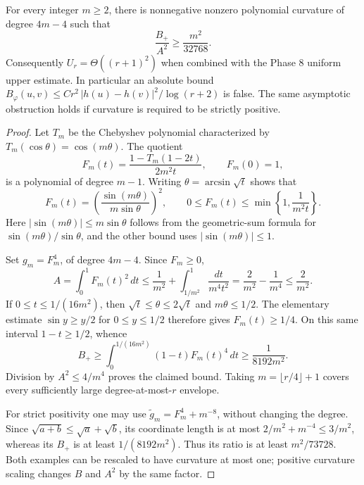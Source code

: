 \begin{proposition}
For every integer $m\geq2$, there is nonnegative nonzero polynomial
curvature of degree $4m-4$ such that
\[
 \frac{B_+}{A^2}\geq\frac{m^2}{32768}.
\]
Consequently $U_r=\Theta((r+1)^2)$ when combined with the Phase 8
uniform upper estimate. In particular an absolute bound
$B_\varphi(u,v)\leq C r^2\,|h(u)-h(v)|^2/\log(r+2)$ is false.
The same asymptotic obstruction holds if curvature is required to be
strictly positive.
\end{proposition}
\begin{proof}
Let $T_m$ be the Chebyshev polynomial characterized by
$T_m(\cos\theta)=\cos(m\theta)$. The quotient
\[
 F_m(t)=\frac{1-T_m(1-2t)}{2m^2t},\qquad F_m(0)=1,
\]
is a polynomial of degree $m-1$. Writing $\theta=\arcsin\sqrt t$
shows that
\[
 F_m(t)=\left(\frac{\sin(m\theta)}{m\sin\theta}\right)^2,
 \qquad 0\leq F_m(t)\leq
     \min\left\{1,\frac1{m^2t}\right\}.
\]
Here $|\sin(m\theta)|\leq m\sin\theta$ follows from the geometric-sum
formula for $\sin(m\theta)/\sin\theta$, and the other bound uses
$|\sin(m\theta)|\leq1$.

Set $g_m=F_m^4$, of degree $4m-4$. Since $F_m\geq0$,
\[
 A=\int_0^1F_m(t)^2\,dt
 \leq\frac1{m^2}+\int_{1/m^2}^1\frac{dt}{m^4t^2}
 =\frac2{m^2}-\frac1{m^4}\leq\frac2{m^2}.
\]
If $0\leq t\leq1/(16m^2)$, then
$\sqrt t\leq\theta\leq2\sqrt t$ and $m\theta\leq1/2$.
The elementary estimate $\sin y\geq y/2$ for $0\leq y\leq1/2$
therefore gives $F_m(t)\geq1/4$. On this same interval $1-t\geq1/2$,
whence
\[
 B_+\geq\int_0^{1/(16m^2)}(1-t)F_m(t)^4\,dt
 \geq\frac1{8192m^2}.
\]
Division by $A^2\leq4/m^4$ proves the claimed bound. Taking
$m=\lfloor r/4\rfloor+1$ covers every sufficiently large
degree-at-most-$r$ envelope.

For strict positivity one may use $\widetilde g_m=F_m^4+m^{-8}$,
without changing the degree. Since $\sqrt{a+b}\leq\sqrt a+\sqrt b$,
its coordinate length is at most $2/m^2+m^{-4}\leq3/m^2$, whereas its
$B_+$ is at least $1/(8192m^2)$. Thus its ratio is at least
$m^2/73728$. Both examples can be rescaled to have curvature at most one;
positive curvature scaling changes $B$ and $A^2$ by the same factor.
\end{proof}

